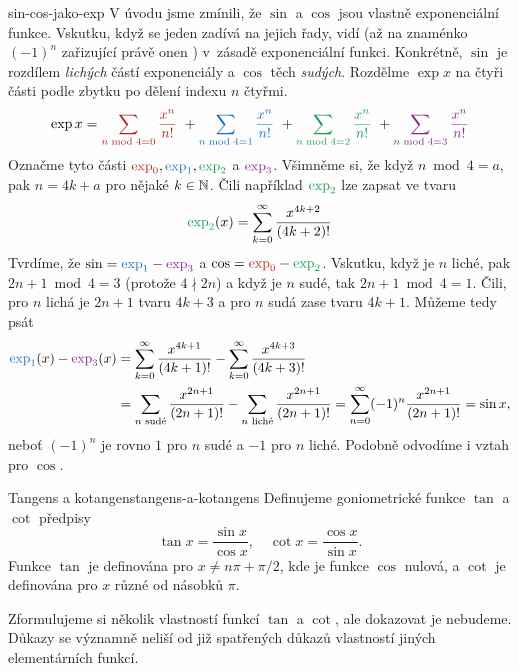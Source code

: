 \begin{remark}{}{sin-cos-jako-exp}
 V úvodu jsme zmínili, že $\sin$ a $\cos$ jsou vlastně exponenciální funkce.
 Vskutku, když se jeden zadívá na jejich řady, vidí (až na znaménko $(-1)^{n}$
 zařizující právě onen ) v~zásadě exponenciální funkci.
 Konkrétně, $\sin$ je rozdílem \emph{lichých} částí exponenciály a $\cos$ těch
 \emph{sudých}. Rozdělme $\exp x$ na čtyři části podle zbytku po dělení indexu
 $n$ čtyřmi.
 \[
  \exp x = \clr{\sum_{n \bmod 4 = 0} \frac{x^{n}}{n!}}~+ \clb{\sum_{n \bmod 4 =
  1} \frac{x^{n}}{n!}}~+\clg{\sum_{n \bmod 4 = 2} \frac{x^{n}}{n!}}~+\clm{\sum_{n \bmod 4 =
  3} \frac{x^{n}}{n!}}
 \]
 Označme tyto části $\clr{\exp_0}, \clb{\exp_1}, \clg{\exp_2}$ a $\clm{\exp_3}$.
 Všimněme si, že když $n \bmod 4 = a$, pak $n = 4k + a$ pro nějaké $k \in \mathbb{N}$.
 Čili například $\clg{\exp_2}$ lze zapsat ve tvaru
 \[
  \clg{\exp_2}(x) = \sum_{k=0}^{\infty} \frac{x^{4k + 2}}{(4k + 2)!}
 \]
 Tvrdíme, že $\sin = \clb{\exp_1} - \clm{\exp_3}$ a $\cos = \clr{\exp_0} -
 \clg{\exp_2}$. Vskutku, když je $n$ liché, pak $2n+1 \bmod 4 = 3$ (protože $4
 \nmid 2n$) a když je $n$ sudé, tak $2n + 1 \bmod 4 = 1$. Čili, pro $n$ lichá je
 $2n + 1$ tvaru $4k+3$ a pro $n$ sudá zase tvaru $4k+1$. Můžeme tedy psát
 \begin{align*}
  \clb{\exp_1}(x) - \clm{\exp_3}(x) &= \sum_{k=0}^{\infty}
  \frac{x^{4k+1}}{(4k+1)!} - \sum_{k=0}^{\infty} \frac{x^{4k+3}}{(4k+3)!}\\
                                    &=\sum_{n \text{ sudé}}
                                    \frac{x^{2n+1}}{(2n+1)!} - \sum_{n \text{
                                    liché}} \frac{x^{2n+1}}{(2n+1)!} =
                                    \sum_{n=0}^{\infty}
                                    (-1)^{n}\frac{x^{2n+1}}{(2n+1)!} = \sin x,
 \end{align*}
 neboť $(-1)^{n}$ je rovno $1$ pro $n$ sudé a $-1$ pro $n$ liché. Podobně
 odvodíme i vztah pro $\cos$.
\end{remark}

\begin{definition}{Tangens a kotangens}{tangens-a-kotangens}
 Definujeme goniometrické funkce $\tan$ a $\cot$ předpisy
 \[
  \tan x = \frac{\sin x}{\cos x}, \quad \cot x = \frac{\cos x}{\sin x}.
 \]
 Funkce $\tan$ je definována pro $x \neq n\pi + \pi / 2$, kde je funkce
 $\cos$ nulová, a $\cot$ je definována pro $x$ různé od násobků $\pi$.
\end{definition}

Zformulujeme si několik vlastností funkcí $\tan$ a $\cot$, ale dokazovat je
nebudeme. Důkazy se významně neliší od již spatřených důkazů vlastností jiných
elementárních funkcí.

